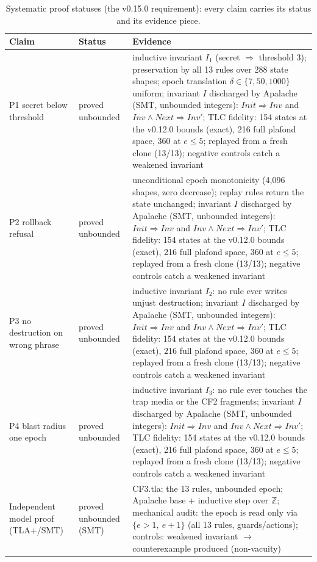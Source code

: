 \begin{table}[t]
\centering\small
\caption{Systematic proof statuses (the v0.15.0 requirement): every claim carries its status and its evidence piece.}
\label{tab:statuts}
\begin{tabularx}{\textwidth}{lXX}
\toprule
Claim & Status & Evidence \\
\midrule
P1 secret below threshold & proved unbounded & inductive invariant $I_1$ (secret $\Rightarrow$ threshold 3); preservation by all 13 rules over 288 state shapes; epoch translation $\delta\in\{7,50,1000\}$ uniform; invariant $I$ discharged by Apalache (SMT, unbounded integers): $Init \Rightarrow Inv$ and $Inv \wedge Next \Rightarrow Inv'$; TLC fidelity: 154 states at the v0.12.0 bounds (exact), 216 full plafond space, 360 at $e\le5$; replayed from a fresh clone (13/13); negative controls catch a weakened invariant \\
P2 rollback refusal & proved unbounded & unconditional epoch monotonicity (4{,}096 shapes, zero decrease); replay rules return the state unchanged; invariant $I$ discharged by Apalache (SMT, unbounded integers): $Init \Rightarrow Inv$ and $Inv \wedge Next \Rightarrow Inv'$; TLC fidelity: 154 states at the v0.12.0 bounds (exact), 216 full plafond space, 360 at $e\le5$; replayed from a fresh clone (13/13); negative controls catch a weakened invariant \\
P3 no destruction on wrong phrase & proved unbounded & inductive invariant $I_2$: no rule ever writes unjust destruction; invariant $I$ discharged by Apalache (SMT, unbounded integers): $Init \Rightarrow Inv$ and $Inv \wedge Next \Rightarrow Inv'$; TLC fidelity: 154 states at the v0.12.0 bounds (exact), 216 full plafond space, 360 at $e\le5$; replayed from a fresh clone (13/13); negative controls catch a weakened invariant \\
P4 blast radius one epoch & proved unbounded & inductive invariant $I_3$: no rule ever touches the trap media or the CF2 fragments; invariant $I$ discharged by Apalache (SMT, unbounded integers): $Init \Rightarrow Inv$ and $Inv \wedge Next \Rightarrow Inv'$; TLC fidelity: 154 states at the v0.12.0 bounds (exact), 216 full plafond space, 360 at $e\le5$; replayed from a fresh clone (13/13); negative controls catch a weakened invariant \\
Independent model proof (TLA+/SMT) & proved unbounded (SMT) & CF3.tla: the 13 rules, unbounded epoch; Apalache base + inductive step over $\mathbb{Z}$; mechanical audit: the epoch is read only via $\{e{>}1,\ e{+}1\}$ (all 13 rules, guards/actions); controls: weakened invariant $\rightarrow$ counterexample produced (non-vacuity) \\

\end{tabularx}
\end{table}
